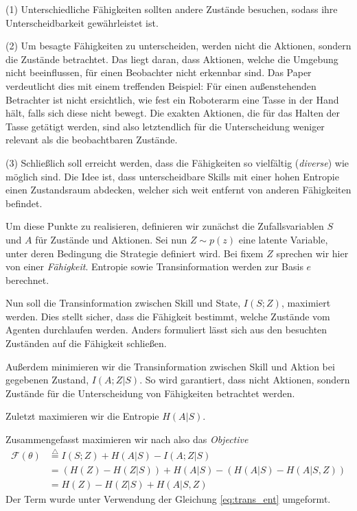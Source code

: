 \smallspace

(1) Unterschiedliche Fähigkeiten sollten andere Zustände besuchen, sodass ihre Unterscheidbarkeit gewährleistet ist.

(2) Um besagte Fähigkeiten zu unterscheiden, werden nicht die Aktionen, sondern die Zustände betrachtet. Das liegt daran, dass Aktionen, welche die Umgebung nicht beeinflussen, für einen Beobachter nicht erkennbar sind. Das Paper verdeutlicht dies mit einem treffenden Beispiel: Für einen außenstehenden Betrachter ist nicht ersichtlich, wie fest ein Roboterarm eine Tasse in der Hand hält, falls sich diese nicht bewegt. Die exakten Aktionen, die für das Halten der Tasse getätigt werden, sind also letztendlich für die Unterscheidung weniger relevant als die beobachtbaren Zustände.

(3) Schließlich soll erreicht werden, dass die Fähigkeiten so vielfältig (\textit{diverse}) wie möglich sind. Die Idee ist, dass unterscheidbare Skills mit einer hohen Entropie einen Zustandsraum abdecken, welcher sich weit entfernt von anderen Fähigkeiten befindet.

\smallspace

Um diese Punkte zu realisieren, definieren wir zunächst die Zufallsvariablen $ S $ und $ A $ für Zustände und Aktionen. Sei nun $ Z \sim p(z) $ eine latente Variable, unter deren Bedingung die Strategie definiert wird. Bei fixem $ Z $ sprechen wir hier von einer \textit{Fähigkeit}. Entropie sowie Transinformation werden zur Basis $ e $ berechnet.

Nun soll die Transinformation zwischen Skill und State, $ I(S;Z) $, maximiert werden. Dies stellt sicher, dass die Fähigkeit bestimmt, welche Zustände vom Agenten durchlaufen werden. Anders formuliert lässt sich aus den besuchten Zuständen auf die Fähigkeit schließen.

Außerdem minimieren wir die Transinformation zwischen Skill und Aktion bei gegebenen Zustand, $ I(A; Z | S) $. So wird garantiert, dass nicht Aktionen, sondern Zustände für die Unterscheidung von Fähigkeiten betrachtet werden.

Zuletzt maximieren wir die Entropie $ H(A|S) $.

\smallspace

Zusammengefasst maximieren wir nach \cite{diversity_eysenbach} also das \textit{Objective}
\begin{align}
    \mathcal{F}(\theta) &\stackrel{\triangle}{=} I(S;Z) + H(A|S) - I(A;Z|S) \label{eq:objective_1}\\
    & = (H(Z) - H(Z|S)) + H(A|S) - (H(A|S) - H(A|S,Z)) \nonumber\\
    & = H(Z) - H(Z|S) + H(A|S,Z) \label{eq:objective_intuitive}
\end{align}
Der Term wurde unter Verwendung der Gleichung \eqref{eq:trans_ent} umgeformt.

